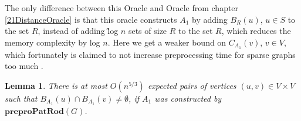 \documentclass[shortabstract, lic, english]{iithesis}
\theoremstyle{definition} \newtheorem{definition}{Definition}[chapter]
\theoremstyle{remark} \newtheorem{remark}[definition]{Observation}
\theoremstyle{plain} \newtheorem{theorem}[definition]{Theorem}
\theoremstyle{plain} \newtheorem{lemma}[definition]{Lemma}
\theoremstyle{plain} \newtheorem{conjecture}[definition]{Conjecture}
\begin{document}
The only difference between this Oracle and Oracle from chapter \ref{21DistanceOracle} is that this oracle
constructs $A_1$ by adding $B_R(u)$, $u \in S$ to the set $R$, instead of adding \~log $n$ sets of size $R$ to the set $R$, which reduces the memory complexity by log $n$.
Here we get a weaker bound on $C_{A_1}(v)$, $v \in V$, which fortunately is claimed to not increase preprocessing time for sparse graphs too much \cite{21OracleSpannerNoPenaltyNoLog}.

\begin{lemma} \label{patRodBallIntersections}
    There is at most $O(n^{5/3})$ expected pairs of vertices $(u, v) \in V \times V$
    such that $B_{A_1}(u) \cap B_{A_1}(v) \neq \emptyset$,
    if $A_1$ was constructed by $\mathbf{preproPatRod}(G)$.
\end{lemma}
\end{document}
